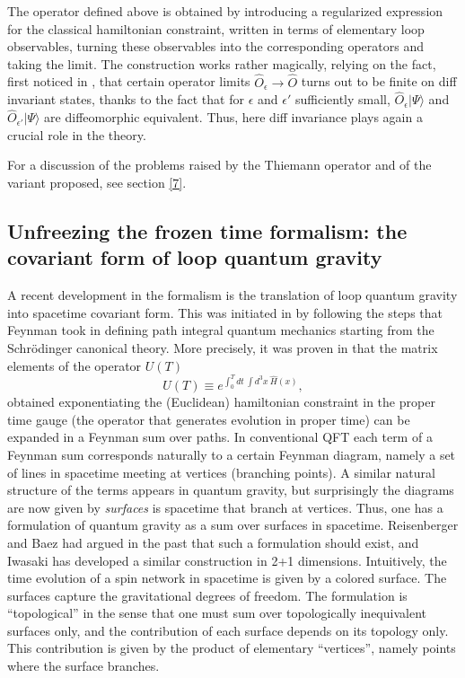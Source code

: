 The operator defined above is obtained by introducing a 
regularized expression for the classical hamiltonian constraint, 
written in terms of elementary loop observables, turning these 
observables into the corresponding operators and taking the 
limit.  The construction works rather magically, relying on the 
fact, first noticed in \cite{RovelliSmolin94b}, that certain 
operator limits $\hat O_{\epsilon}\rightarrow \hat O$ turns out 
to be finite on diff invariant states, thanks to the fact that 
for $\epsilon$ and $\epsilon'$ sufficiently small, $\hat 
O_{\epsilon}|\Psi\rangle$ and $\hat O_{\epsilon'}|\Psi\rangle$ 
are diffeomorphic equivalent.  Thus, here diff invariance plays 
again a crucial role in the theory.

For a discussion of the problems raised by the Thiemann operator 
and of the variant proposed, see section \ref{7}. 


\subsection{Unfreezing the frozen time formalism: the 
covariant form of loop quantum gravity}\label{spacetime}

A recent development in the formalism is the translation 
of loop quantum gravity into spacetime covariant form.  This 
was initiated in \cite{RovelliSurf,ReisenbergerRovelli} by following 
the steps that Feynman took in defining path integral 
quantum mechanics starting from the Schr\"odinger canonical 
theory.  More precisely, it was proven in 
\cite{ReisenbergerRovelli} that the matrix elements of the 
operator $U(T)$ 
\begin{equation}
	U(T) \equiv e^{\int_{0}^{T}dt\ \int d^{3}x\ \hat H(x)}, 
\end{equation}
obtained exponentiating the (Euclidean) hamiltonian 
constraint in the proper time gauge (the operator that 
generates evolution in proper time) can be expanded in a 
Feynman sum over paths.  In conventional QFT each term of 
a Feynman sum corresponds naturally to a certain Feynman 
diagram, namely a set of lines in spacetime meeting at 
vertices (branching points).  A similar 
natural structure of the terms appears in quantum gravity, 
but surprisingly the diagrams are now given by {\em surfaces\/} is 
spacetime that branch at vertices.  Thus, one has a 
formulation of quantum gravity as a sum over surfaces in 
spacetime. Reisenberger \cite{Reisenberger94} and Baez 
\cite{Baez94b} had argued in the past that such a 
formulation should exist, and Iwasaki has developed a similar 
construction in 2+1 dimensions. Intuitively, the time evolution of a 
spin network in spacetime is given by a colored surface. 
 The surfaces capture the gravitational degrees 
of freedom.  The formulation is ``topological'' in the 
sense that one must sum over topologically inequivalent 
surfaces only, and the contribution of each surface 
depends on its topology only.  This contribution is given 
by the product of elementary ``vertices'', namely points 
where the surface branches. 

